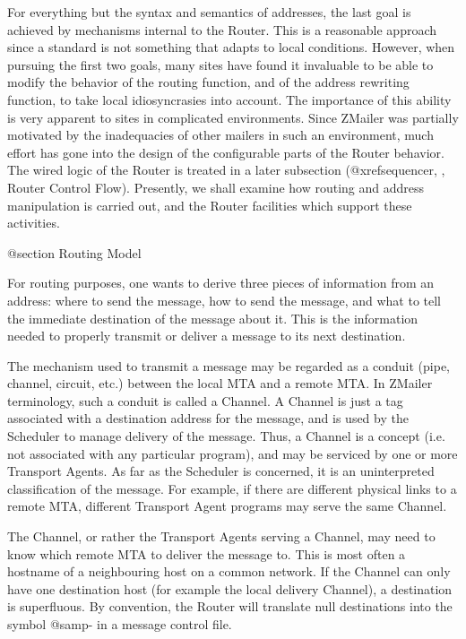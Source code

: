 {For everything but the syntax and semantics of addresses, the last goal is
achieved by mechanisms internal to the Router.
This is a reasonable approach since a standard is not something that adapts
to local conditions.
However, when pursuing the first two goals, many sites have found
it invaluable to be able to modify the behavior of the routing function,
and of the address rewriting function, to take local idiosyncrasies
into account.
The importance of this ability is very apparent to sites in complicated
environments.
Since ZMailer was partially motivated by the inadequacies of other
mailers in such an environment, much effort has gone into the design
of the configurable parts of the Router behavior.
The wired logic of the Router is treated in a later subsection
(@xref{sequencer, , Router Control Flow}).
Presently, we shall examine how routing and address manipulation
is carried out, and the Router facilities which support these activities.

@section Routing Model

For routing purposes, one wants to derive three pieces of information
from an address: where to send the message, how to send the message,
and what to tell the immediate destination of the message about it.
This is the information needed to properly transmit or deliver
a message to its next destination.

The mechanism used to transmit a message may be regarded as a conduit
(pipe, channel, circuit, etc.) between the local MTA and a remote MTA.
In ZMailer terminology, such a conduit is called a Channel.
A Channel is just a tag associated with a destination address for
the message, and is used by the Scheduler to manage delivery of the message.
Thus, a Channel is a concept (i.e. not associated with any particular
program), and may be serviced by one or more Transport Agents.
As far as the Scheduler is concerned, it is an uninterpreted
classification of the message.
For example, if there are different physical links to a remote MTA,
different Transport Agent programs may serve the same Channel.

The Channel, or rather the Transport Agents serving a Channel,
may need to know which remote MTA to deliver the message to.
This is most often a hostname of a neighbouring host on a common network.
If the Channel can only have one destination host (for example the local
delivery Channel), a destination is superfluous.
By convention, the Router will translate null destinations into
the symbol @samp{-} in a message control file.

}
